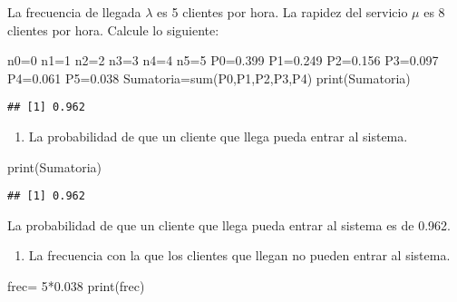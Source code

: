 \documentclass[
]{article}
\newenvironment{Shaded}{\begin{snugshade}}{\end{snugshade}}
\newcommand{\DecValTok}[1]{\textcolor[rgb]{0.00,0.00,0.81}{#1}}
\newcommand{\FloatTok}[1]{\textcolor[rgb]{0.00,0.00,0.81}{#1}}
\newcommand{\FunctionTok}[1]{\textcolor[rgb]{0.00,0.00,0.00}{#1}}
\newcommand{\NormalTok}[1]{#1}
\newcommand{\OtherTok}[1]{\textcolor[rgb]{0.56,0.35,0.01}{#1}}
\newcommand{\SpecialCharTok}[1]{\textcolor[rgb]{0.00,0.00,0.00}{#1}}
\providecommand{\tightlist}{%
  \setlength{\itemsep}{0pt}\setlength{\parskip}{0pt}}
\begin{document}
La frecuencia de llegada \(λ\) es 5 clientes por hora. La rapidez del
servicio \(μ\) es 8 clientes por hora. Calcule lo siguiente:

\begin{Shaded}
\begin{Highlighting}[]
\NormalTok{n0}\OtherTok{=}\DecValTok{0}
\NormalTok{n1}\OtherTok{=}\DecValTok{1}
\NormalTok{n2}\OtherTok{=}\DecValTok{2}
\NormalTok{n3}\OtherTok{=}\DecValTok{3}
\NormalTok{n4}\OtherTok{=}\DecValTok{4}
\NormalTok{n5}\OtherTok{=}\DecValTok{5}
\NormalTok{P0}\OtherTok{=}\FloatTok{0.399}
\NormalTok{P1}\OtherTok{=}\FloatTok{0.249}
\NormalTok{P2}\OtherTok{=}\FloatTok{0.156}
\NormalTok{P3}\OtherTok{=}\FloatTok{0.097}
\NormalTok{P4}\OtherTok{=}\FloatTok{0.061}
\NormalTok{P5}\OtherTok{=}\FloatTok{0.038}
\NormalTok{Sumatoria}\OtherTok{=}\FunctionTok{sum}\NormalTok{(P0,P1,P2,P3,P4)}
\FunctionTok{print}\NormalTok{(Sumatoria)}
\end{Highlighting}
\end{Shaded}

\begin{verbatim}
## [1] 0.962
\end{verbatim}

\begin{enumerate}
\def\labelenumi{\alph{enumi})}
\tightlist
\item
  La probabilidad de que un cliente que llega pueda entrar al sistema.
\end{enumerate}

\begin{Shaded}
\begin{Highlighting}[]
\FunctionTok{print}\NormalTok{(Sumatoria)}
\end{Highlighting}
\end{Shaded}

\begin{verbatim}
## [1] 0.962
\end{verbatim}

La probabilidad de que un cliente que llega pueda entrar al sistema es
de 0.962.

\begin{enumerate}
\def\labelenumi{\alph{enumi})}
\setcounter{enumi}{1}
\tightlist
\item
  La frecuencia con la que los clientes que llegan no pueden entrar al
  sistema.
\end{enumerate}

\begin{Shaded}
\begin{Highlighting}[]
\NormalTok{frec}\OtherTok{=} \DecValTok{5}\SpecialCharTok{*}\FloatTok{0.038}
\FunctionTok{print}\NormalTok{(frec)}
\end{Highlighting}
\end{Shaded}
\end{document}
